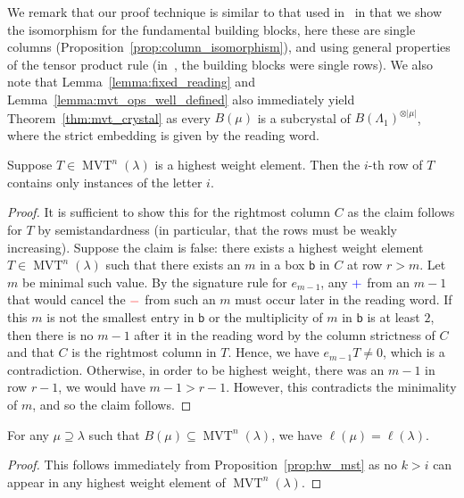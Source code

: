 \documentclass[ALCO,ThmDefs,Unicode,epreuves]{cedram}
\newcommand{\bbb}{\mathsf{b}}
\newcommand{\abs}[1]{\lvert #1 \rvert}
\DeclareMathOperator{\mvt}{MVT} %
\newcommand{\bplus}{{\color{blue}+}}
\newcommand{\bminus}{{\color{red}-}}
\begin{document}
We remark that our proof technique is similar to that used in~\cite{MPS18} in that we show the isomorphism for the fundamental building blocks, here these are single columns (Proposition~\ref{prop:column_isomorphism}), and using general properties of the tensor product rule (in~\cite{MPS18}, the building blocks were single rows).
We also note that Lemma~\ref{lemma:fixed_reading} and Lemma~\ref{lemma:mvt_ops_well_defined} also immediately yield Theorem~\ref{thm:mvt_crystal} as every $B(\mu)$ is a subcrystal of $B(\Lambda_1)^{\otimes \abs{\mu}}$, where the strict embedding is given by the reading word.


\begin{prop}
\label{prop:hw_mst}
Suppose $T \in \mvt^n(\lambda)$ is a highest weight element.  Then the $i$-th row of $T$ contains only instances of the letter $i$.
\end{prop}

\begin{proof}
It is sufficient to show this for the rightmost column $C$ as the claim follows for $T$ by semistandardness (in particular, that the rows must be weakly increasing). Suppose the claim is false: there exists a highest weight element $T \in \mvt^n(\lambda)$ such that there exists an $m$ in a box $\bbb$ in $C$ at row $r > m$. Let $m$ be minimal such value. By the signature rule for $e_{m-1}$, any $\bplus$ from an $m-1$ that would cancel the $\bminus$ from such an $m$ must occur later in the reading word. If this $m$ is not the smallest entry in $\bbb$ or the multiplicity of $m$ in $\bbb$ is at least $2$, then there is no $m-1$ after it in the reading word by the column strictness of $C$ and that $C$ is the rightmost column in $T$. Hence, we have $e_{m-1} T \neq 0$, which is a contradiction. Otherwise, in order to be highest weight, there was an $m-1$ in row $r-1$, we would have $m - 1 > r - 1$. However, this contradicts the minimality of $m$, and so the claim follows.
\end{proof}

\begin{coro}
\label{cor:same_length_mst}
For any $\mu \supseteq \lambda$ such that $B(\mu) \subseteq \mvt^n(\lambda)$, we have $\ell(\mu) = \ell(\lambda)$.
\end{coro}

\begin{proof}
This follows immediately from Proposition~\ref{prop:hw_mst} as no $k > i$ can appear in any highest weight element of $\mvt^n(\lambda)$.
\end{proof}
\end{document}
